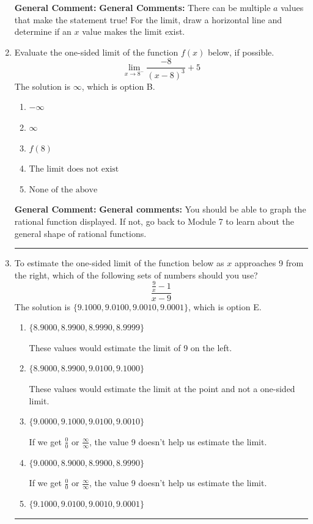\documentclass{extbook}[14pt]
\newcommand{\litem}[1]{\item #1

\rule{\textwidth}{0.4pt}}
\begin{document}
\begin{enumerate}
{\textbf{General Comment:} \textbf{General Comments:} There can be multiple $a$ values that make the statement true! For the limit, draw a horizontal line and determine if an $x$ value makes the limit exist.
}
\litem{
Evaluate the one-sided limit of the function $f(x)$ below, if possible.
\[ \lim_{x \rightarrow 8^-} \frac{-8}{(x-8)^3}+5 \]The solution is \( \infty \), which is option B.\begin{enumerate}[label=\Alph*.]
\item \( -\infty \)


\item \( \infty \)


\item \( f(8) \)


\item \( \text{The limit does not exist} \)


\item \( \text{None of the above} \)


\end{enumerate}

\textbf{General Comment:} \textbf{General comments:} You should be able to graph the rational function displayed. If not, go back to Module 7 to learn about the general shape of rational functions.
}
\litem{
To estimate the one-sided limit of the function below as $x$ approaches 9 from the right, which of the following sets of numbers should you use?
\[ \frac{\frac{9}{x} - 1}{x - 9} \]The solution is \( \{ 9.1000, 9.0100, 9.0010, 9.0001 \} \), which is option E.\begin{enumerate}[label=\Alph*.]
\item \( \{ 8.9000, 8.9900, 8.9990, 8.9999 \} \)

These values would estimate the limit of 9 on the left.
\item \( \{ 8.9000, 8.9900, 9.0100, 9.1000 \} \)

These values would estimate the limit at the point and not a one-sided limit.
\item \( \{ 9.0000, 9.1000, 9.0100, 9.0010 \} \)

If we get $\frac{0}{0}$ or $\frac{\infty}{\infty}$, the value 9 doesn't help us estimate the limit.
\item \( \{ 9.0000, 8.9000, 8.9900, 8.9990 \} \)

If we get $\frac{0}{0}$ or $\frac{\infty}{\infty}$, the value 9 doesn't help us estimate the limit.
\item \( \{ 9.1000, 9.0100, 9.0010, 9.0001 \} \)


\end{enumerate}}
\end{enumerate}
\end{document}
